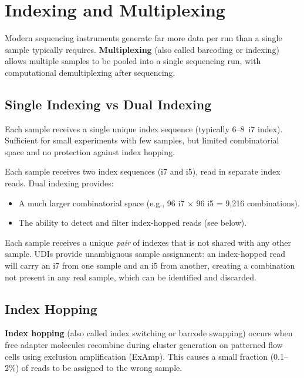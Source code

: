 \section{Indexing and Multiplexing}
\label{sec:indexing}

Modern sequencing instruments generate far more data per run than a single sample typically requires. \textbf{Multiplexing} (also called barcoding or indexing) allows multiple samples to be pooled into a single sequencing run, with computational demultiplexing after sequencing.

\subsection{Single Indexing vs Dual Indexing}

\begin{description}[style=nextline, font=\bfseries]
  \item[Single indexing.] Each sample receives a single unique index sequence (typically 6--8\basepair\ i7 index). Sufficient for small experiments with few samples, but limited combinatorial space and no protection against index hopping.

  \item[Dual indexing.] Each sample receives two index sequences (i7 and i5), read in separate index reads. Dual indexing provides:
  \begin{itemize}[nosep]
    \item A much larger combinatorial space (e.g., 96 i7 $\times$ 96 i5 = 9{,}216 combinations).
    \item The ability to detect and filter index-hopped reads (see below).
  \end{itemize}

  \item[Unique Dual Indexes (UDI).] Each sample receives a unique \emph{pair} of indexes that is not shared with any other sample. UDIs provide unambiguous sample assignment: an index-hopped read will carry an i7 from one sample and an i5 from another, creating a combination not present in any real sample, which can be identified and discarded.
\end{description}

\subsection{Index Hopping}

\textbf{Index hopping} (also called index switching or barcode swapping) occurs when free adapter molecules recombine during cluster generation on patterned flow cells using exclusion amplification (ExAmp). This causes a small fraction (0.1--2\%) of reads to be assigned to the wrong sample.

